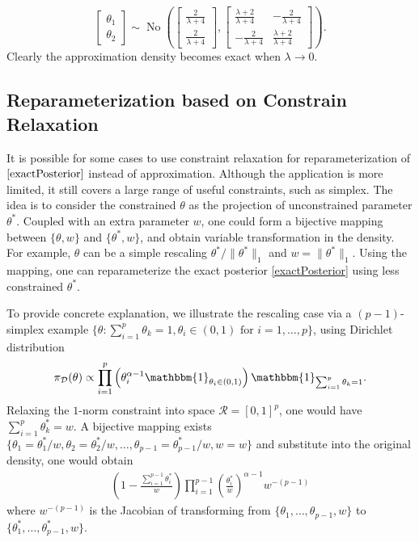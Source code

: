 \documentclass[10pt]{article}
\newcommand{\be}{\begin{equation}\begin{aligned}}
\newcommand{\ee}{\end{aligned}\end{equation}}
\newcommand{\mc}[1]{\mathcal{#1}}
\DeclareMathOperator{\No}{No}
\DeclareMathOperator{\1}{\mathbbm{1}}
\begin{document}
$$\begin{bmatrix} \theta_1 \\ \theta_2 \end{bmatrix} \sim
\No \left(
\begin{bmatrix} \frac{2}{\lambda+4} \\ \frac{2}{\lambda+4} \end{bmatrix},
\begin{bmatrix} \frac{\lambda+2}{\lambda+4} & -\frac{2}{\lambda+4}  \\  -\frac{2}{\lambda+4}  &\frac{\lambda+2}{\lambda+4} \end{bmatrix}
\right).$$
Clearly the approximation density becomes exact when $\lambda\rightarrow 0$.

\subsection{Reparameterization based on Constrain Relaxation}
It is possible for some cases to use constraint relaxation for reparameterization of $\eqref{exactPosterior}$ instead of approximation. Although the application is more limited, it still covers a large range of useful constraints, such as simplex. The idea is to consider the constrained $\theta$ as the projection of unconstrained parameter $\theta^*$. Coupled with an extra parameter $w$, one could form a bijective mapping between $\{\theta,w\}$ and $\{\theta^*, w\}$, and obtain variable transformation in the density. For example, $\theta$ can be a simple rescaling $\theta^*/\|\theta^*\|_1$ and $w=\|\theta^*\|_1$. Using the mapping, one can reparameterize the exact posterior \eqref{exactPosterior} using less constrained $\theta^*$.

To provide concrete explanation, we illustrate the rescaling case via a $(p-1)$-simplex example
$\{\theta:  \sum_{i=1}^p\theta_k=1, \theta_i\in(0,1) \text{ for } i=1,\ldots,p\}$, using Dirichlet distribution 
\be
\pi_{\mc D}(\theta)\propto \prod_{i=1}^p \left(\theta_i^{\alpha-1}\mathbbm{1}_{\theta_i\in(0,1)} \right)\mathbbm{1}_{\sum_{i=1}^p\theta_k=1}.
\ee
Relaxing the $1$-norm constraint into space $\mc R=[0,1]^p$, one would have $\sum_{i=1}^p\theta^*_k=w$. A bijective mapping exists $\{ \theta_1= \theta_1^*/w,\theta_2= \theta_2^*/w,\ldots, \theta_{p-1}= {\theta_{p-1}^*}/{w}, w= w\}$ and substitute into the original density, one would obtain 
\be
(1-\frac{\sum_{i=1}^{p-1} \theta^*_i}{w})	\prod_{i=1}^{p-1} (\frac{\theta_i^*}{w})^{\alpha-1}  w^{-(p-1)}
\ee
where $w^{-(p-1)}$ is the Jacobian of transforming from $\{\theta_1,\ldots,\theta_{p-1},w\}$ to $\{\theta^*_1,\ldots,\theta^*_{p-1},w\}$.
\end{document}
